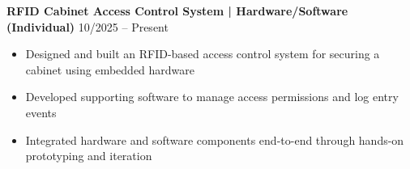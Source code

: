\noindent
\textbf{RFID Cabinet Access Control System | Hardware/Software (Individual)} \hfill 10/2025 -- Present
\begin{itemize}
    \item Designed and built an RFID-based access control system for securing a cabinet using embedded hardware
    \item Developed supporting software to manage access permissions and log entry events
    \item Integrated hardware and software components end-to-end through hands-on prototyping and iteration
\end{itemize}
